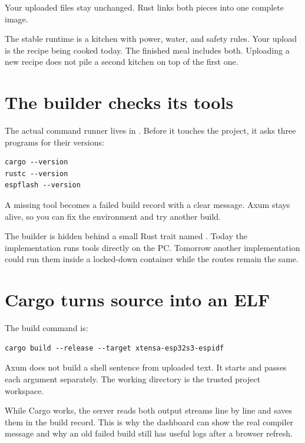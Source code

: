 Your uploaded files stay unchanged. Rust links both pieces into one complete image.

\begin{mentorbox}
The stable runtime is a kitchen with power, water, and safety rules. Your upload is the recipe being cooked today. The finished meal includes both. Uploading a new recipe does not pile a second kitchen on top of the first one.
\end{mentorbox}

\section{The builder checks its tools}

The actual command runner lives in . Before it touches the project, it asks three programs for their versions:

\begin{lstlisting}
cargo --version
rustc --version
espflash --version
\end{lstlisting}

A missing tool becomes a failed build record with a clear message. Axum stays alive, so you can fix the environment and try another build.

The builder is hidden behind a small Rust trait named . Today the implementation runs tools directly on the PC. Tomorrow another implementation could run them inside a locked-down container while the routes remain the same.

\section{Cargo turns source into an ELF}

The build command is:

\begin{lstlisting}
cargo build --release --target xtensa-esp32s3-espidf
\end{lstlisting}

Axum does not build a shell sentence from uploaded text. It starts  and passes each argument separately. The working directory is the trusted project workspace.

While Cargo works, the server reads both output streams line by line and saves them in the build record. This is why the dashboard can show the real compiler message and why an old failed build still has useful logs after a browser refresh.


